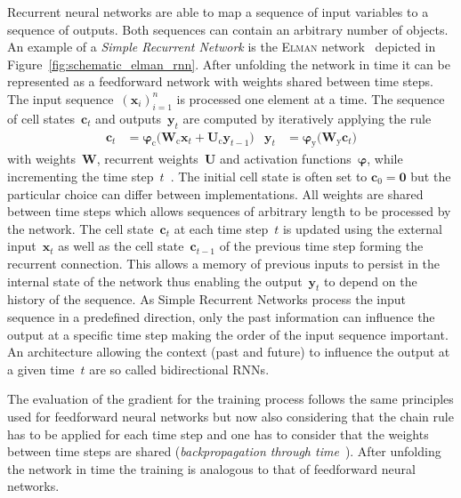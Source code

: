 Recurrent neural networks are able to map a sequence of input variables to a
sequence of outputs. Both sequences can contain an arbitrary number of objects.
An example of a \emph{Simple Recurrent Network} is the \textsc{Elman}
network~\cite{elman} depicted in Figure~\ref{fig:schematic_elman_rnn}. After
unfolding the network in time it can be represented as a feedforward network
with weights shared between time steps. The input
sequence~$\left( \mathbf{x}_i \right)_{i=1}^n$ is processed one element at a
time. The sequence of cell states~$\mathbf{c}_t$ and outputs~$\mathbf{y}_t$ are
computed by iteratively applying the rule
\begin{align*}
  \mathbf{c}_t &= \bm{\varphi}_{\text{c}}\Big( \mathbf{W}_{\text{c}} \mathbf{x}_{t} + \mathbf{U}_{\text{c}} \mathbf{y}_{t-1} \Big)
  &\mathbf{y}_t &= \bm{\varphi}_{\text{y}}\Big( \mathbf{W}_{\text{y}} \mathbf{c}_{t} \Big)
\end{align*}
with weights~$\mathbf{W}$, recurrent weights~$\mathbf{U}$ and activation
functions~$\bm{\varphi}$, while incrementing the time step~$t$~\cite{elman,
  graves}. The initial cell state is often set to $\mathbf{c}_0 = \mathbf{0}$
but the particular choice can differ between implementations. All weights are
shared between time steps which allows sequences of arbitrary length to be
processed by the network. The cell state~$\mathbf{c}_t$ at each time step~$t$ is
updated using the external input~$\mathbf{x}_t$ as well as the cell
state~$\mathbf{c}_{t-1}$ of the previous time step forming the recurrent
connection. This allows a memory of previous inputs to persist in the internal
state of the network thus enabling the output~$\mathbf{y}_t$ to depend on the
history of the sequence. As Simple Recurrent Networks process the input sequence
in a predefined direction, only the past information can influence the output at
a specific time step making the order of the input sequence important. An
architecture allowing the context (past and future) to influence the output at a
given time~$t$ are so called bidirectional RNNs.

The evaluation of the gradient for the training process follows the same
principles used for feedforward neural networks but now also considering that
the chain rule has to be applied for each time step and one has to consider that
the weights between time steps are shared (\emph{backpropagation through
  time}~\cite{williams_zipser}). After unfolding the network in time the
training is analogous to that of feedforward neural networks.

